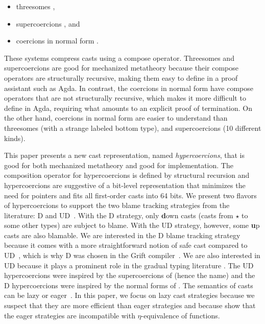 \documentclass[acmsmall,review]{acmart}\settopmatter{printfolios=true,printccs=false,printacmref=false}
\newcommand{\TOOdyn}[0]{\star}
\begin{document}
\begin{itemize}
\item threesomes 
\citep{Siek:2010:TWB:1706299.1706342,Garcia:2013:CTB:2500365.2500603},
\item supercoercions \citep{Garcia:2013:CTB:2500365.2500603}, and
\item coercions in normal form
  \citep{siek2012interpretations,Siek:2015:BCT:2737924.2737968}.
\end{itemize}
These systems compress casts using a compose operator.
Threesomes and supercoercions are good for mechanized
metatheory because their compose operators are structurally recursive,
making them easy to define in a proof assistant such as Agda. In
contrast, the coercions in normal form have compose operators that are
not structurally recursive, which makes it more difficult to define in
Agda, requiring what amounts to an explicit proof of termination.
%
On the other hand, coercions in normal form are easier to understand
than threesomes (with a strange labeled bottom type), and
supercoercions (10 different kinds).

This paper presents a new cast representation, named
\emph{hypercoercions}, that is good for both mechanized metatheory and
good for implementation. The composition operator for hypercoercions
is defined by structural recursion and hypercoercions are suggestive
of a bit-level representation that minimizes the need for pointers and
fits all first-order casts into 64 bits.
%
We present two flavors of hypercoercions to support the two blame
tracking strategies from the literature: D and
UD~\citep{siek2009exploring}. With the D strategy, only \textbf{d}own casts 
(casts from $\TOOdyn$ to some other types) are subject to blame. With the UD 
strategy, however, some \textbf{u}p casts are also blamable.
We are interested in the D blame
tracking strategy because it comes with a more straightforward notion of
safe cast compared to UD~\citep{siek2009exploring}, which is why D was
chosen in the Grift compiler~\citep{kuhlenschmidt2018efficient}. We are also 
interested in UD because it plays a
prominent role in the gradual typing literature
\citep{wadler2009well}.  The UD hypercoercions were inspired by the
supercoercions of \citet{Garcia:2013:CTB:2500365.2500603} (hence the name) and
the D hypercoercions were inspired by the normal forms of
\citet{siek2012interpretations}.
%
The semantics of casts can be lazy or
eager~\citep{siek2009exploring}. In this paper, we focus on lazy cast
strategies because we suspect that they are more efficient than eager
strategies and because \citet{new2019gradual} show that the eager
strategies are incompatible with $\eta$-equivalence of functions.
\end{document}
